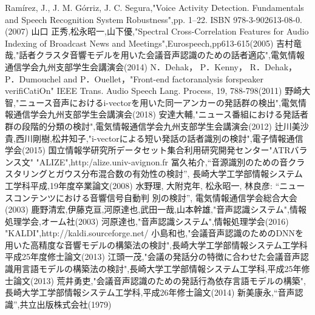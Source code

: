 \begin{thebibliography}{99}     %
Ramírez, J., J. M. Górriz, J. C. Segura,"Voice Activity Detection. Fundamentals and Speech Recognition System Robustness",pp. 1–22. ISBN 978-3-902613-08-0.(2007)
山口 正秀,松永昭一,山下優,"Spectral Cross-Correlation Features for Audio Indexing of Broadcast News and Meetings",Eurospeech,pp613-615(2005)
吉村竜哉,"話者クラスタ音響モデルを用いた会議音声認識のための話者適応",電気情報通信学会九州支部学生会講演会(2014)
N．Dehak， P．Kenny， R．Dehak， P．Dumouchel and P．Ouellet，"Front-end factoranalysis forspeaker verifiCatiOn" IEEE Trans. Audio Speech Lang. Process, 19, 788-798(2011)
野崎大智,"ニュース音声におけるi-vectorを用いた同一アンカーの発話群の検出",電気情報通信学会九州支部学生会講演会(2018)
安達大輔,"ニュース番組における発話者群の段階的分類の検討",電気情報通信学会九州支部学生会講演会(2012)
辻川美沙貴,西川剛樹,松井知子,"i-vectorによる短い発話の話者識別の検討",電子情報通信学会(2015)
国立情報学研究所データセット集合利用研究開発センター"ATRバランス文"
"ALIZE",http:/alize.univ-avignon.fr
冨久祐介,“音源識別のための音クラスタリングとガウス分布混合数の有効性の検討”,
長崎大学工学部情報システム工学科平成,19年度卒業論文(2008)
水野理, 大附克年, 松永昭一, 林良彦: “ニュースコンテンツにおける音響信号自動判
別の検討”, 電気情報通信学会総合大会(2003)
鹿野清宏,伊藤克亘,河原達也,武田一哉,山本幹雄,"音声認識システム",情報処理学会,オーム社(2003)
河原達也,"音声認識システム",情報処理学会(2016)
"KALDI",http://kaldi.sourceforge.net/
小島和也,"会議音声認識のためのDNNを用いた高精度な音響モデルの構築法の検討",長崎大学工学部情報システム工学科 平成25年度修士論文(2013)
江頭一茂,"会議の発話分の特徴に合わせた会議音声認識用言語モデルの構築法の検討",長崎大学工学部情報システム工学科,平成25年修士論文(2013)
荒井勇吏,"会議音声認識のための発話行為依存言語モデルの構築",長崎大学工学部情報システム工学科,平成26年修士論文(2014)
新美康永,“音声認識”,共立出版株式会社(1979)
\end{thebibliography}
